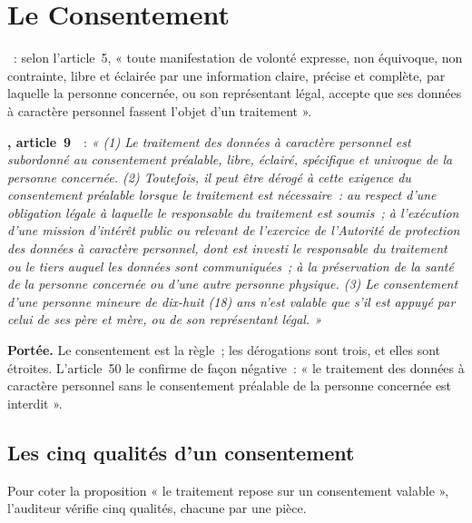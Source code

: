 \section{Le Consentement}
\label{sec:c02-consentement}

\begin{boxdef}
~: selon l'article~5, « toute manifestation de volonté
expresse, non équivoque, non contrainte, libre et éclairée par une
information claire, précise et complète, par laquelle la personne
concernée, ou son représentant légal, accepte que ses données à caractère
personnel fassent l'objet d'un traitement ».
\end{boxdef}

\begin{boxjuris}
\textbf{, article~9}~\cite{loi2024017}~:
\textit{« (1) Le traitement des données à caractère personnel est subordonné
au consentement préalable, libre, éclairé, spécifique et univoque de la
personne concernée. (2) Toutefois, il peut être dérogé à cette exigence du
consentement préalable lorsque le traitement est nécessaire~: au respect
d'une obligation légale à laquelle le responsable du traitement est soumis~;
à l'exécution d'une mission d'intérêt public ou relevant de l'exercice de
l'Autorité de protection des données à caractère personnel, dont est
investi le responsable du traitement ou le tiers auquel les données sont
communiquées~; à la préservation de la santé de la personne concernée ou
d'une autre personne physique. (3) Le consentement d'une personne mineure de
dix-huit (18) ans n'est valable que s'il est appuyé par celui de ses père
et mère, ou de son représentant légal. »}

\smallskip
\textbf{Portée.} Le consentement est la règle~; les dérogations sont trois,
et elles sont étroites. L'article~50 le confirme de façon négative~:
« le traitement des données à caractère personnel sans le consentement
préalable de la personne concernée est interdit ».
\end{boxjuris}

\subsection{Les cinq qualités d'un consentement}

Pour coter \OUI{} la proposition « le traitement repose sur un consentement
valable », l'auditeur vérifie cinq qualités, chacune par une pièce.

